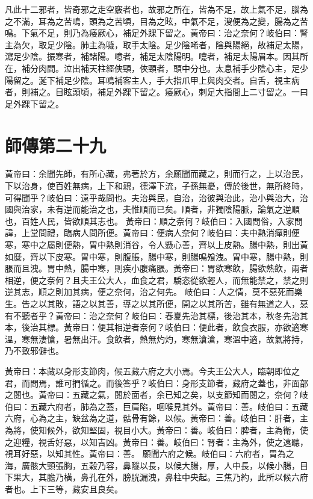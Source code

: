 凡此十二邪者，皆奇邪之走空竅者也，故邪之所在，皆為不足，故上氣不足，腦為之不滿，耳為之苦鳴，頭為之苦頃，目為之眩，中氣不足，溲便為之變，腸為之苦鳴。下氣不足，則乃為痿厥心，補足外踝下留之。黃帝曰：治之奈何？岐伯曰：腎主為欠，取足少陰。肺主為噦，取手太陰。足少陰唏者，陰與陽絕，故補足太陽，瀉足少陰。振寒者，補諸陽。噫者，補足太陰陽明。嚏者，補足太陽眉本。因其所在，補分肉間。泣出補天柱經俠頸，俠頸者，頭中分也。太息補手少陰心主，足少陽留之。涎下補足少陰。耳鳴補客主人，手大指爪甲上與肉交者。自舌，視主病者，則補之。目眩頭頃，補足外踝下留之。痿厥心，刺足大指間上二寸留之。一曰足外踝下留之。

\section{師傳第二十九}

黃帝曰：余聞先師，有所心藏，弗著於方，余願聞而藏之，則而行之，上以治民，下以治身，使百姓無病，上下和親，德澤下流，子孫無憂，傳於後世，無所終時，可得聞乎？岐伯曰：遠乎哉問也。夫治與民，自治，治彼與治此，治小與治大，治國與治家，未有逆而能治之也，夫惟順而已矣。順者，非獨陰陽脈，論氣之逆順也，百姓人民，皆欲順其志也。
黃帝曰：順之奈何？岐伯曰：入國問俗，入家問諱，上堂問禮，臨病人問所便。黃帝曰：便病人奈何？岐伯曰：夫中熱消癉則便寒，寒中之屬則便熱，胃中熱則消谷，令人懸心善，齊以上皮熱。腸中熱，則出黃如糜，齊以下皮寒。胃中寒，則腹脹，腸中寒，則腸鳴飧洩。胃中寒，腸中熱，則脹而且洩。胃中熱，腸中寒，則疾小腹痛脹。黃帝曰：胃欲寒飲，腸欲熱飲，兩者相逆，便之奈何？且夫王公大人，血食之君，驕恣從欲輕人，而無能禁之，禁之則逆其志，順之則加其病，便之奈何，治之何先。
岐伯曰：人之情，莫不惡死而樂生。告之以其敗，語之以其善，導之以其所便，開之以其所苦，雖有無道之人，惡有不聽者乎？黃帝曰：治之奈何？岐伯曰：春夏先治其標，後治其本，秋冬先治其本，後治其標。黃帝曰：便其相逆者奈何？岐伯曰：便此者，飲食衣服，亦欲適寒溫，寒無淒愴，暑無出汗。食飲者，熱無灼灼，寒無滄滄，寒溫中適，故氣將持，乃不致邪僻也。

黃帝曰：本藏以身形支節肉，候五藏六府之大小焉。今夫王公大人，臨朝即位之君，而問焉，誰可捫循之。而後答乎？岐伯曰：身形支節者，藏府之蓋也，非面部之閱也。黃帝曰：五藏之氣，閱於面者，余已知之矣，以支節知而閱之，奈何？岐伯曰：五藏六府者，肺為之蓋，巨肩陷，咽喉見其外。黃帝曰：善。岐伯曰：五藏六府，心為之主，缺盆為之道，骷骨有餘，以候。黃帝曰：善。岐伯曰：肝者，主為將，使知候外，欲知堅固，視目小大。黃帝曰：善。岐伯曰：脾者，主為衛，使之迎糧，視舌好惡，以知吉凶。黃帝曰：善。岐伯曰：腎者：主為外，使之遠聽，視耳好惡，以知其性。黃帝曰：善。
願聞六府之候。岐伯曰：六府者，胃為之海，廣骸大頸張胸，五穀乃容，鼻隧以長，以候大腸，厚，人中長，以候小腸，目下果大，其膽乃橫，鼻孔在外，膀胱漏洩，鼻柱中央起。三焦乃約，此所以候六府者也。上下三等，藏安且良矣。



